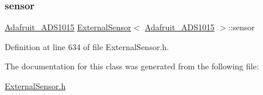 \subsubsection{\texorpdfstring{sensor}{sensor}}
{\footnotesize\ttfamily \hyperlink{class_adafruit___a_d_s1015}{Adafruit\+\_\+\+A\+D\+S1015} \hyperlink{class_external_sensor}{External\+Sensor}$<$ \hyperlink{class_adafruit___a_d_s1015}{Adafruit\+\_\+\+A\+D\+S1015} $>$\+::sensor\hspace{0.3cm}{\ttfamily [private]}}



Definition at line 634 of file External\+Sensor.\+h.



The documentation for this class was generated from the following file\+:\begin{DoxyCompactItemize}
\item 
\hyperlink{_external_sensor_8h}{External\+Sensor.\+h}\end{DoxyCompactItemize}
